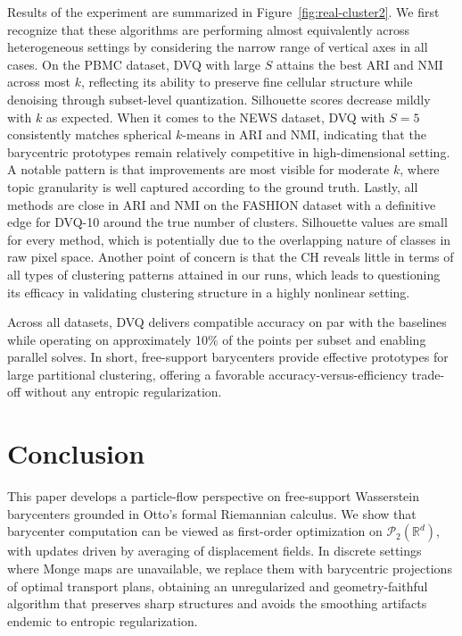 \documentclass[11pt]{article}
\newcommand{\bbR}{\mathbb{R}}
\newcommand{\calP}{\mathcal{P}}
\begin{document}
Results of the experiment are summarized in Figure~\ref{fig:real-cluster2}. We first recognize that these algorithms are performing almost equivalently across heterogeneous settings by considering the narrow range of vertical axes in all cases. On the \textsf{PBMC} dataset, DVQ with large $S$ attains the best ARI and NMI across most $k$, reflecting its ability to preserve fine cellular structure while denoising through subset-level quantization. Silhouette scores decrease mildly with $k$ as expected. When it comes to the \textsf{NEWS} dataset, DVQ with $S=5$ consistently matches spherical $k$-means in ARI and NMI, indicating that the barycentric prototypes remain relatively competitive in high-dimensional setting. A notable pattern is that improvements are most visible for moderate $k$, where topic granularity is well captured according to the ground truth. Lastly, all methods are close in ARI and NMI on the \textsf{FASHION} dataset with a definitive edge for DVQ-10 around the true number of clusters. Silhouette values are small for every method, which is potentially due to the overlapping nature of classes in raw pixel space. Another point of concern is that the CH reveals little in terms of all types of clustering patterns attained in our runs, which leads to questioning its efficacy in validating clustering structure in a highly nonlinear setting.  

Across all datasets, DVQ delivers compatible accuracy on par with the baselines while operating on approximately 10\% of the points per subset and enabling parallel solves. In short, free-support barycenters provide effective prototypes for large partitional clustering, offering a favorable accuracy-versus-efficiency trade-off without any entropic regularization.





\section{Conclusion}\label{sec:chp6-conclusion}



This paper develops a particle-flow perspective on free-support Wasserstein barycenters grounded in Otto’s formal Riemannian calculus. We show that barycenter computation can be viewed as first-order optimization on $\calP_2(\bbR^d)$, with updates driven by averaging of displacement fields. In discrete settings where Monge maps are unavailable, we replace them with barycentric projections of optimal transport plans, obtaining an unregularized and geometry-faithful algorithm that preserves sharp structures and avoids the smoothing artifacts endemic to entropic regularization.
\end{document}
